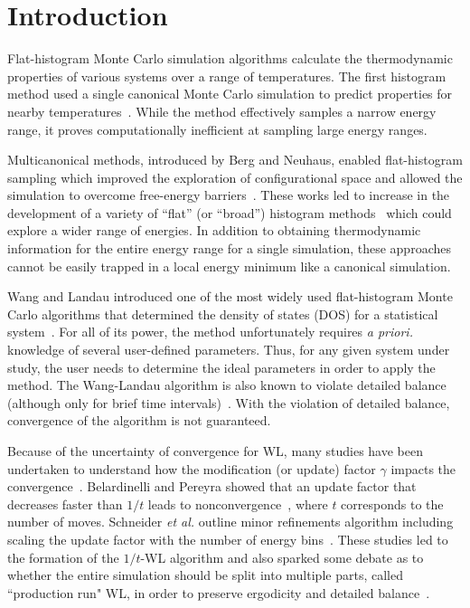 \section{Introduction}
Flat-histogram Monte Carlo simulation algorithms calculate the thermodynamic
properties of various systems over a range of temperatures.  The first histogram
method used a single canonical Monte Carlo simulation to predict properties for
nearby temperatures~\cite{ferrenberg1988new}. While the method effectively
samples a narrow energy range, it proves computationally inefficient at sampling large energy ranges.

Multicanonical methods, introduced by Berg and Neuhaus, enabled flat-histogram
sampling which improved the exploration of configurational space and allowed the
simulation to overcome free-energy barriers~\cite{berg1991multicanonical, berg1992multicanonical}.
These works led to increase in the development of a variety of ``flat'' (or ``broad'') histogram
methods~\cite{penna1996broad, penna1998broad, swendsen1999transition,
wang2001determining, wang2001efficient} which could explore a wider range
of energies.  In addition to obtaining thermodynamic information for the entire
energy range for a single simulation, these approaches cannot be easily trapped
in a local energy minimum like a canonical simulation.


Wang and Landau introduced one of the most widely used flat-histogram
Monte Carlo algorithms that determined the density of states (DOS) for
a statistical system~\cite{wang2001determining,wang2001efficient}. For all of
its power, the method unfortunately requires \emph{a priori.} knowledge of several
user-defined parameters. Thus, for any given system under study, the user needs
to determine the ideal parameters in order to apply the method. The Wang-Landau
algorithm is also known to violate detailed balance (although only for brief
time intervals)~\cite{yan2003fast, shell2002generalization}. With the violation
of detailed balance, convergence of the algorithm is not guaranteed.

Because of the uncertainty of convergence for WL, many studies have been undertaken
to understand how the modification (or update) factor $\gamma$ impacts the
convergence~\cite{zhou2005understanding,lee2006convergence,
belardinelli2007wang}. Belardinelli and Pereyra showed that an update factor that decreases faster than $1/t$ leads to nonconvergence~\cite{belardinelli2007wang, belardinelli2008analysis, zhou2008optimal}, where $t$ corresponds to the number of moves. Schneider \emph{et al.} outline minor refinements algorithm including scaling the update factor with the number of energy bins~\cite{schneider2017convergence}.
These studies led to the
formation of the $1/t$-WL algorithm and also sparked some debate as to whether
the entire simulation should be split into multiple parts, called ``production run" WL, in order to preserve ergodicity and
detailed balance~\cite{jayasri2005wang, mukhopadhyay2008monte}.

